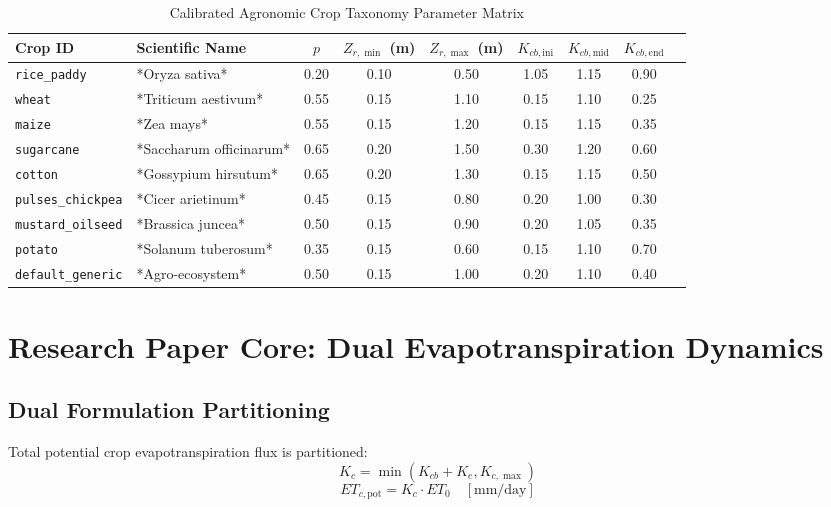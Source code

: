 \documentclass[11pt,a4paper]{article}
\theoremstyle{definition}
\theoremstyle{remark}
\begin{document}
\begin{table}[htbp]
\centering
\caption{Calibrated Agronomic Crop Taxonomy Parameter Matrix}
\label{tab:crop_taxonomy}
\small
\begin{tabular}{llccccccc}
\toprule
\textbf{Crop ID} & \textbf{Scientific Name} & $p$ & $Z_{r,\min}$ (m) & $Z_{r,\max}$ (m) & $K_{cb,\text{ini}}$ & $K_{cb,\text{mid}}$ & $K_{cb,\text{end}}$ \\
\midrule
\texttt{rice\_paddy}       & *Oryza sativa*        & 0.20 & 0.10 & 0.50 & 1.05 & 1.15 & 0.90 \\
\texttt{wheat}            & *Triticum aestivum*   & 0.55 & 0.15 & 1.10 & 0.15 & 1.10 & 0.25 \\
\texttt{maize}            & *Zea mays*            & 0.55 & 0.15 & 1.20 & 0.15 & 1.15 & 0.35 \\
\texttt{sugarcane}        & *Saccharum officinarum*& 0.65 & 0.20 & 1.50 & 0.30 & 1.20 & 0.60 \\
\texttt{cotton}           & *Gossypium hirsutum*  & 0.65 & 0.20 & 1.30 & 0.15 & 1.15 & 0.50 \\
\texttt{pulses\_chickpea} & *Cicer arietinum*     & 0.45 & 0.15 & 0.80 & 0.20 & 1.00 & 0.30 \\
\texttt{mustard\_oilseed} & *Brassica juncea*     & 0.50 & 0.15 & 0.90 & 0.20 & 1.05 & 0.35 \\
\texttt{potato}           & *Solanum tuberosum*   & 0.35 & 0.15 & 0.60 & 0.15 & 1.10 & 0.70 \\
\texttt{default\_generic} & *Agro-ecosystem*      & 0.50 & 0.15 & 1.00 & 0.20 & 1.10 & 0.40 \\
\bottomrule
\end{tabular}
\end{table}


\section{Research Paper Core: Dual Evapotranspiration Dynamics}

\subsection{Dual Formulation Partitioning}
Total potential crop evapotranspiration flux is partitioned:
\begin{equation}
    K_c = \min(K_{cb} + K_e, K_{c,\max})
\end{equation}
\begin{equation}
    ET_{c,\text{pot}} = K_c \cdot ET_0 \quad [\text{mm/day}]
\end{equation}
\end{document}
